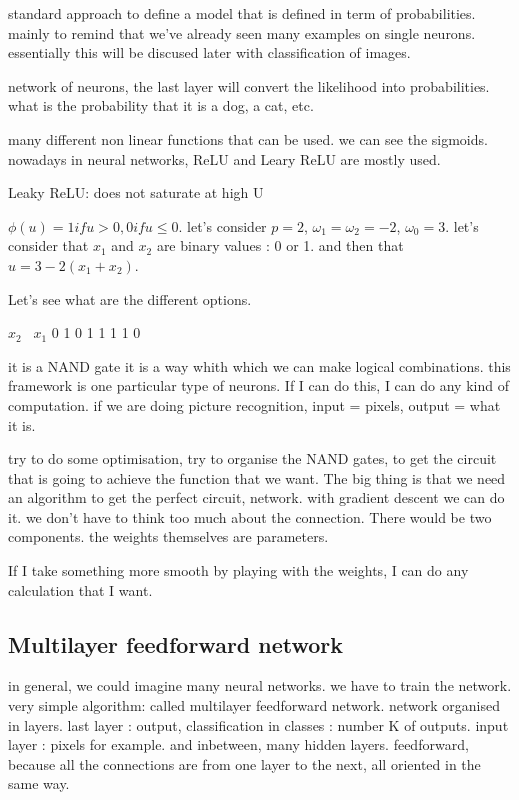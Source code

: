 standard approach to define a model that is defined in term of probabilities.
mainly to remind that we've already seen many examples on single neurons.
essentially this will be discused later with classification of images.

network of neurons, the last layer will convert the likelihood into probabilities.
what is the probability that it is a dog, a cat, etc.

many different non linear functions that can be used. we can see the sigmoids.
nowadays in neural networks, ReLU and Leary ReLU are mostly used.

Leaky ReLU: does not saturate at high U

$\phi(u) = 1 if u>0, 0 if u \leq 0$.
let's consider $p=2$, $\omega_1 = \omega_2 = -2$, $\omega_0 = 3$.
let's consider that $x_1$ and $x_2$ are binary values : 0 or 1.
and then that $u = 3-2(x_1+x_2)$.

Let's see what are the different options.

$x_2$ \ $x_1$   0   1
0               1   1
1               1   0

it is a NAND gate
it is a way whith which we can make logical combinations.
this framework is one particular type of neurons. If I can do this, I can do any
kind of computation.
if we are doing picture recognition, input = pixels, output = what it is.


try to do some optimisation, try to organise the NAND gates, to get the circuit
that is going to achieve the function that we want. The big thing is that 
we need an algorithm to get the perfect circuit, network. with gradient descent
we can do it.
we don't have to think too much about the connection.
There would be two components.
the weights themselves are parameters.

If I take something more smooth by playing with the weights, I can do any
calculation that I want.

\subsection{Multilayer feedforward network}

in general, we could imagine many neural networks.
we have to train the network.
very simple algorithm: called multilayer feedforward network. network organised 
in layers.
last layer : output, classification in classes : number K of outputs.
input layer : pixels for example.
and inbetween, many hidden layers. feedforward, because all the connections are from one layer to the next, all oriented in the same way.

